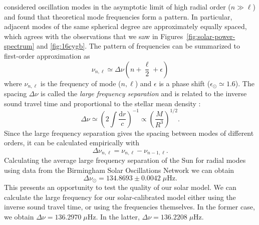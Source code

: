 \citet{1980ApJS...43..469T} considered oscillation modes in the asymptotic limit of high radial order (${n\gg\ell}$) and found that theoretical mode frequencies form a pattern. 
In particular, adjacent modes of the same spherical degree are approximately equally spaced, which agrees with the observations that we saw in Figures~\ref{fig:solar-power-spectrum} and \ref{fig:16cygb}. 
The pattern of frequencies can be summarized to first-order approximation as 
\begin{equation} \label{eq:asymptotic}
    \nu_{n,\ell} \simeq \Delta\nu \left( n + \frac{\ell}{2} + \epsilon \right)
\end{equation}
where $\nu_{n,\ell}$ is the frequency of mode (${n,\ell}$) and $\epsilon$ is a phase shift (${\epsilon_\odot\simeq 1.6}$). 
The spacing ${\Delta\nu}$ is called the \emph{large frequency separation} and is related to the inverse sound travel time and proportional to the stellar mean density \citep{1986apj...306l..37u}:
\begin{equation}
    \Delta\nu
    \simeq
    \left( 
        2 \int \frac{\text{d}r}{c}
    \right)^{-1}
    \propto
    \left(
        \frac{M}{R^3}
    \right)^{1/2}. 
\end{equation}
Since the large frequency separation gives the spacing between modes of different orders, it can be calculated empirically with
\begin{equation} \label{eq:Dnu}
    \Delta\nu_{n,\ell} 
    =
    \nu_{n,\ell}
    -
    \nu_{n-1,\ell}.
\end{equation}
Calculating the average large frequency separation of the Sun for radial modes using data from the Birmingham Solar Oscillations Network \citep[\emph{BiSON},][]{2009mnras.396l.100b} we can obtain 
\begin{equation}
    \Delta\nu_\odot = 134.8693 \pm 0.0042\;\mu\text{Hz}. 
\end{equation}
This presents an opportunity to test the quality of our solar model. 
We can calculate the large frequency for our solar-calibrated model either using the inverse sound travel time, or using the frequencies themselves. 
In the former case, we obtain ${\Delta\nu = 136.2970\;\mu\text{Hz}}$. 
In the latter, ${\Delta\nu = 136.2208\;\mu\text{Hz}}$. 

